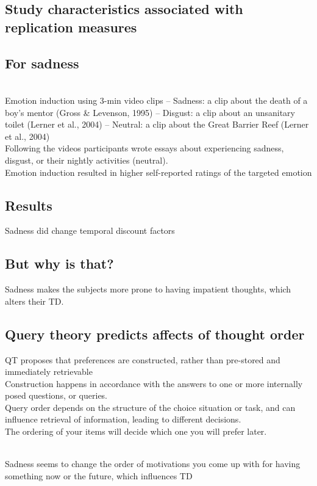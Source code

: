 \subsection{Study characteristics associated with replication measures}

\subsection{For sadness}
\\ Emotion induction using 3-min video clips
– Sadness: a clip about the death of a boy’s mentor (Gross & Levenson, 1995)
– Disgust: a clip about an unsanitary toilet (Lerner et al., 2004)
– Neutral: a clip about the Great Barrier Reef (Lerner et al., 2004)
\\ Following the videos participants wrote essays about experiencing sadness, disgust, or
their nightly activities (neutral). \\Emotion induction resulted in higher self-reported ratings of the targeted emotion

\subsection{Results}
Sadness did change temporal discount factors

\subsection{But why is that?}
Sadness makes the subjects more prone to having impatient thoughts, which alters their TD.

\subsection{Query theory predicts affects of thought order}
QT proposes that preferences are constructed, rather than pre-stored and immediately
retrievable
\\Construction happens in accordance with the answers to one or more internally posed
questions, or queries.
\\Query order depends on the structure of the choice situation or task, and can influence
retrieval of information, leading to different decisions.
\\The ordering of your items will decide which one you will prefer later.

\\Sadness seems to change the order of motivations you come up with for having something now or the future, which influences TD

